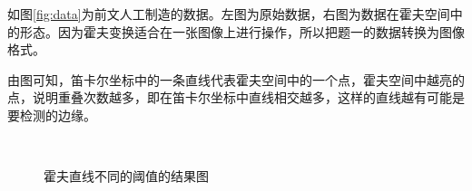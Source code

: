 \documentclass{article}
\begin{document}
如图\ref{fig:data}为前文人工制造的数据。左图为原始数据，右图为数据在霍夫空间中的形态。因为霍夫变换适合在一张图像上进行操作，所以把题一的数据转换为图像格式。

由图可知，笛卡尔坐标中的一条直线代表霍夫空间中的一个点，霍夫空间中越亮的点，说明重叠次数越多，即在笛卡尔坐标中直线相交越多，这样的直线越有可能是要检测的边缘。

\begin{figure}[ht]
	\centering
	\quad
	\\
	\quad
	\caption{霍夫直线不同的阈值的结果图}
	\label{fig:hough-line}
\end{figure}
\end{document}
